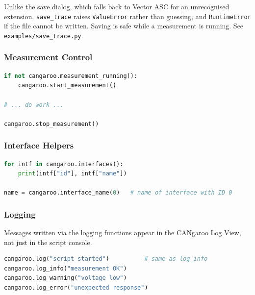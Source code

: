 \documentclass[a4paper,11pt]{article}
\newcommand{\file}[1]{\texttt{#1}}
\begin{document}
\medskip
Unlike the save dialog, which falls back to Vector ASC for an unrecognised
extension, \file{save\_trace} raises \file{ValueError} rather than guessing, and
\file{RuntimeError} if the file cannot be written. Saving is safe while a
measurement is running. See \file{examples/save\_trace.py}.

\subsubsection{Measurement Control}

\begin{lstlisting}[language=Python]
if not cangaroo.measurement_running():
    cangaroo.start_measurement()

# ... do work ...

cangaroo.stop_measurement()
\end{lstlisting}

\subsubsection{Interface Helpers}

\begin{lstlisting}[language=Python, caption={List all active interfaces}]
for intf in cangaroo.interfaces():
    print(intf["id"], intf["name"])

name = cangaroo.interface_name(0)   # name of interface with ID 0
\end{lstlisting}

\subsubsection{Logging}

Messages written via the logging functions appear in the CANgaroo Log View, not
just in the script console.

\begin{lstlisting}[language=Python]
cangaroo.log("script started")          # same as log_info
cangaroo.log_info("measurement OK")
cangaroo.log_warning("voltage low")
cangaroo.log_error("unexpected response")
\end{lstlisting}

\end{document}
